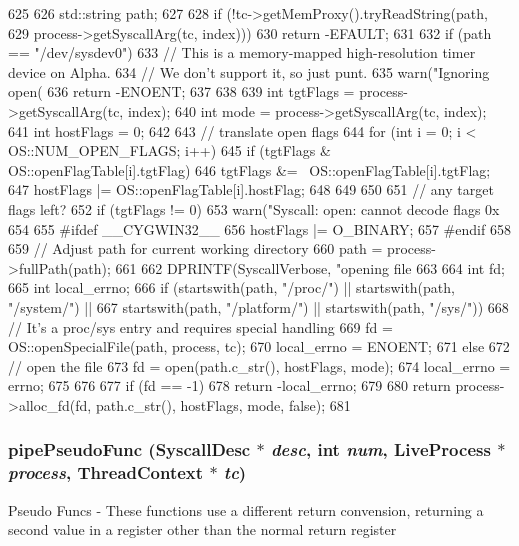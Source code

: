 \begin{DoxyCode}
625 {
626     std::string path;
627 
628     if (!tc->getMemProxy().tryReadString(path,
629                 process->getSyscallArg(tc, index)))
630         return -EFAULT;
631 
632     if (path == "/dev/sysdev0") {
633         // This is a memory-mapped high-resolution timer device on Alpha.
634         // We don't support it, so just punt.
635         warn("Ignoring open(%
636         return -ENOENT;
637     }
638 
639     int tgtFlags = process->getSyscallArg(tc, index);
640     int mode = process->getSyscallArg(tc, index);
641     int hostFlags = 0;
642 
643     // translate open flags
644     for (int i = 0; i < OS::NUM_OPEN_FLAGS; i++) {
645         if (tgtFlags & OS::openFlagTable[i].tgtFlag) {
646             tgtFlags &= ~OS::openFlagTable[i].tgtFlag;
647             hostFlags |= OS::openFlagTable[i].hostFlag;
648         }
649     }
650 
651     // any target flags left?
652     if (tgtFlags != 0)
653         warn("Syscall: open: cannot decode flags 0x%
654 
655 #ifdef __CYGWIN32__
656     hostFlags |= O_BINARY;
657 #endif
658 
659     // Adjust path for current working directory
660     path = process->fullPath(path);
661 
662     DPRINTF(SyscallVerbose, "opening file %
663 
664     int fd;
665     int local_errno;
666     if (startswith(path, "/proc/") || startswith(path, "/system/") ||
667         startswith(path, "/platform/") || startswith(path, "/sys/")) {
668         // It's a proc/sys entry and requires special handling
669         fd = OS::openSpecialFile(path, process, tc);
670         local_errno = ENOENT;
671      } else {
672         // open the file
673         fd = open(path.c_str(), hostFlags, mode);
674         local_errno = errno;
675      }
676 
677     if (fd == -1)
678         return -local_errno;
679 
680     return process->alloc_fd(fd, path.c_str(), hostFlags, mode, false);
681 }
\end{DoxyCode}
\hypertarget{syscall__emul_8hh_a58d1892bcde783939ea74a6685ebc68b}{
\subsubsection[{pipePseudoFunc}]{ pipePseudoFunc ({\bf SyscallDesc} $\ast$ {\em desc}, \/  int {\em num}, \/  {\bf LiveProcess} $\ast$ {\em process}, \/  {\bf ThreadContext} $\ast$ {\em tc})}}
\label{syscall__emul_8hh_a58d1892bcde783939ea74a6685ebc68b}
Pseudo Funcs -\/ These functions use a different return convension, returning a second value in a register other than the normal return register 


